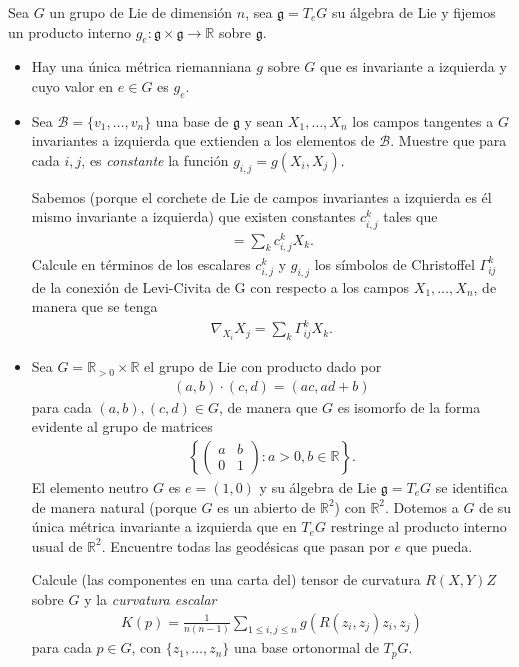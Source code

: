 \documentclass[11pt]{article}
\newcommand{\R}{\mathbb{R}}
\newcommand{\paint}[1]{\color{color}{#1}}
\newenvironment{exercise}[2][Ejercicio]{\begin{trivlist}
\item[\hskip \labelsep \paint{{\bfseries #1}}\hskip \labelsep {\bfseries #2.}]}{\end{trivlist}}
\begin{document}
\begin{exercise}{5} Sea $G$ un grupo de Lie de dimensión $n$, sea $\mathfrak{g} = T_eG$ su álgebra de Lie y fijemos un producto interno $g_e : \mathfrak{g} \times \mathfrak{g} \to \R$ sobre $\mathfrak{g}$.
\begin{itemize}[listparindent = \parindent]
\item[(a)] Hay una única métrica riemanniana $g$ sobre $G$ que es invariante a izquierda y cuyo valor en $e \in G$ es $g_e$.
\item[(b)] Sea $\mathscr{B} = \{v_1, \dots, v_n\}$ una base de $\mathfrak{g}$ y sean $X_1, \dots, X_n$ los campos tangentes a $G$ invariantes a izquierda que extienden a los elementos de $\mathscr{B}$. Muestre que para cada $i,j$, es \textit{constante} la función $g_{i,j} = g(X_i,X_j)$.

Sabemos (porque el corchete de Lie de campos invariantes a izquierda es él mismo invariante a izquierda) que existen constantes $c_{i,j}^k$ tales que
\begin{align*}
[X_i,X_j] = \sum_{k}c_{i,j}^kX_k.
\end{align*}
Calcule en términos de los escalares $c_{i,j}^k$ y $g_{i,j}$ los símbolos de Christoffel $\Gamma_{ij}^k$ de la conexión de Levi-Civita de G con respecto a los campos $X_1, \dots, X_n$, de manera que se tenga
\begin{align*}
\nabla_{X_i}X_j = \sum_k\Gamma_{ij}^kX_k.
\end{align*}
\item[(c)] Sea $G = \R_{>0 } \times \R$ el grupo de Lie con producto dado por
\begin{align*}
(a,b) \cdot (c,d) = (ac,ad+b)
\end{align*}
para cada $(a,b),(c,d) \in G$, de manera que $G$ es isomorfo de la forma evidente al grupo de matrices 
\begin{align*}
\left\{\begin{pmatrix}
a & b \\
0 & 1
\end{pmatrix} : a >0, b \in \R\right\}.
\end{align*}
El elemento neutro $G$ es $e = (1,0)$ y su álgebra de Lie $\mathfrak{g} = T_eG$ se identifica de manera natural (porque $G$ es un abierto de $\R^2$) con $\R^2$. Dotemos a $G$ de su única métrica invariante a izquierda que en $T_eG$ restringe al producto interno usual de $\R^2$. Encuentre todas las geodésicas que pasan por $e$ que pueda.

Calcule (las componentes en una carta del) tensor de curvatura $R(X,Y)Z$ sobre $G$ y la \textit{curvatura escalar}
\begin{align*}
K(p) = \frac{1}{n(n-1)} \sum_{1 \leq i,j \leq n}g(R(z_i,z_j)z_i,z_j)
\end{align*}
para cada $p \in G$, con $\{z_1, \dots, z_n\}$ una base ortonormal de $T_pG$.
\end{itemize}
\end{exercise}
\end{document}
